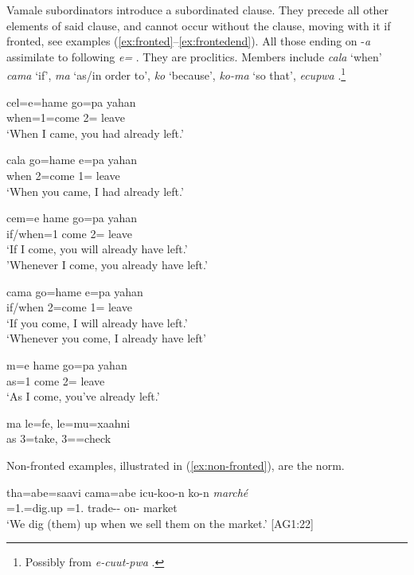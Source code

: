 Vamale subordinators introduce a subordinated clause. They precede all other elements of said clause, and cannot occur without the clause, moving with it if fronted, see examples (\ref{ex:fronted}--\ref{ex:frontedend}). All those ending on -\textit{a} assimilate to following \textit{e=} . They are proclitics.
Members include \textit{cala} `when' \textit{cama} `if', \textit{ma} `as\slash in order to', \textit{ko} `because', \textit{ko-ma} `so that',  \textit{ecupwa}  .\footnote{Possibly from \textit{e-cuut-pwa} .}

\ea \label{ex:fronted}
\gll cel=e=hame go=pa yahan\\
 when=1=come 2= leave\\
\glt `When I came, you had already left.'
\z


\ea
\gll cala go=hame e=pa yahan\\
 when 2=come 1= leave\\
\glt `When you came, I had already left.'
\z


\ea
\gll cem=e hame go=pa yahan\\
 if/when=1 come 2= leave\\
\glt `If I come, you will already have left.' \\'Whenever I come, you already have left.'
\z


\ea
\gll cama go=hame e=pa yahan\\
 if/when 2=come 1= leave\\
\glt `If you come, I will already have left.' \\ `Whenever you come, I already have left'
\z


\ea
\gll m=e hame go=pa yahan\\
 as=1 come 2= leave\\
\glt `As I come, you've already left.'
\z


\ea \label{ex:frontedend}
\gll ma le=fe, le=mu=xaahni\\
 as 3=take, 3==check\\
\glt {}
\z

Non-fronted examples, illustrated in (\ref{ex:non-fronted}), are the norm.

\ea \label{ex:non-fronted}
\gll tha=abe=saavi cama=abe icu-koo-n ko-n \textit{marché}\\
 =1.=dig.up =1. trade-- on- market\\
\glt `We dig (them) up when we sell them on the market.' {[AG1:22]}
\z


